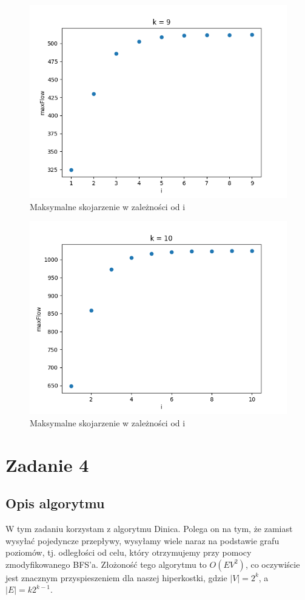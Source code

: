 \documentclass{report}
\begin{document}
\begin{figure}[H]
    \centering
    \includegraphics[scale=0.55]{../ex2/plots/k9.png}
    \caption{Maksymalne skojarzenie w zależności od i}
\end{figure}
\begin{figure}[H]
    \centering
    \includegraphics[scale=0.55]{../ex2/plots/k10.png}
    \caption{Maksymalne skojarzenie w zależności od i}
\end{figure}

\section*{Zadanie 4}
\subsection*{Opis algorytmu}
W tym zadaniu korzystam z algorytmu Dinica. Polega on na tym,
że zamiast wysyłać pojedyncze przepływy, wysyłamy wiele naraz
na podstawie grafu poziomów, tj. odległości od celu, który otrzymujemy
przy pomocy zmodyfikowanego BFS'a. Złożoność tego algorytmu to
$O(EV^2)$, co oczywiście jest znacznym przyspieszeniem dla naszej hiperkostki,
gdzie $|V| = 2^k$, a $|E| = k2^{k-1}$.
\end{document}
